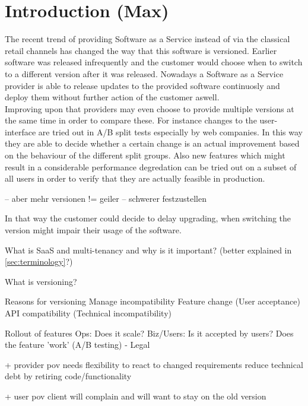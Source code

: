 \section{Introduction (Max)}

The recent trend of providing Software as a Service instead of via the classical retail channels has changed the way that this software is versioned.
Earlier software was released infrequently and the customer would choose when to switch to a different version after it was released.
Nowadays a Software as a Service provider is able to release updates to the provided software continuosly and deploy them without further action of the customer aswell.
\\
Improving upon that providers may even choose to provide multiple versions at the same time in order to compare these.
For instance changes to the user-interface are tried out in A/B split tests especially by web companies.
In this way they are able to decide whether a certain change is an actual improvement based on the behaviour of the different split groups.
Also new features which might result in a considerable performance degredation can be tried out on a subset of all users in order to verify that they are actually feasible in production.

-- aber mehr versionen != geiler
--   schwerer festzustellen



In that way the customer could decide to delay upgrading, when switching the version might impair their usage of the software.

What is SaaS and multi-tenancy and why is it important? (better explained in \ref{sec:terminology}?)

What is versioning?

Reasons for versioning
  Manage incompatibility
    Feature change (User acceptance)
    API compatibility (Technical incompatibility)

  Rollout of features
    Ops: Does it scale?
    Biz/Users: Is it accepted by users? Does the feature 'work' (A/B testing)
  - Legal

  + provider pov
  needs flexibility to react to changed requirements
  reduce technical debt by retiring code/functionality

  + user pov
  client will complain and will want to stay on the old version
